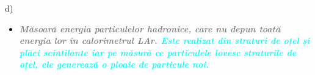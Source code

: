 \documentclass{beamer}
\begin{document}

\begin{frame}{d) }

\vspace{-2.5cm}

\begin{itemize}

\small

\item [\ding{88}]\makebox[0.5cm]{} \textit{\textbf{\textcolor{gray}{Măsoară energia particulelor hadronice, care nu depun toată energia lor în calorimetrul LAr.} \textcolor{cyan}{Este realizat din straturi de oțel și plăci scintilante iar pe măsură ce particulele lovesc straturile de oțel, ele generează o ploaie de particule noi. }}}

\end{itemize}



\end{frame}
\end{document}
